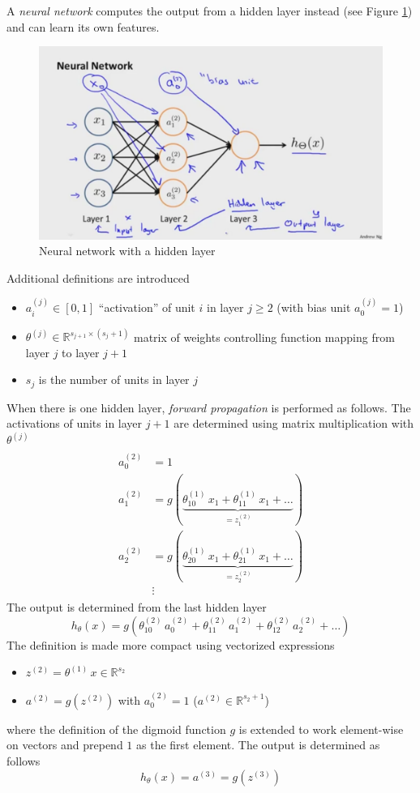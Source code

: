 \documentclass[a4paper,twoside,10pt]{article}
\begin{document}
A \emph{neural network} computes the output from a hidden layer instead (see Figure \ref{fig:hidden}) and can learn its own features.
\begin{figure}[htbp]
  \begin{center}
    \includegraphics[width=.6\textwidth]{hidden}
    \caption{Neural network with a hidden layer\citep{andrewng}\label{fig:hidden}}
  \end{center}
\end{figure}
Additional definitions are introduced
\begin{itemize}
  \item $a^{(j)}_i\in[0,1]$ ``activation'' of unit $i$ in layer $j\ge 2$ (with bias unit $a^{(j)}_0=1$)
  \item $\theta^{(j)}\in\mathbb{R}^{s_{j+1}\times(s_j+1)}$ matrix of weights controlling function mapping from layer $j$ to layer $j+1$
  \item $s_j$ is the number of units in layer $j$
\end{itemize}
When there is one hidden layer, \emph{forward propagation} is performed as follows.
The activations of units in layer $j+1$ are determined using matrix multiplication with $\theta^{(j)}$
\begin{align*}
  \begin{split}
    a^{(2)}_0&=1\\
    a^{(2)}_1&=g(\underbrace{\theta^{(1)}_{10}\,x_1+\theta^{(1)}_{11}\,x_1+\ldots}_{=z^{(2)}_1})\\
    a^{(2)}_2&=g(\underbrace{\theta^{(1)}_{20}\,x_1+\theta^{(1)}_{21}\,x_1+\ldots}_{=z^{(2)}_2})\\
    &\vdots
  \end{split}
\end{align*}
The output is determined from the last hidden layer
\begin{equation*}
  h_\theta(x)=g(\theta^{(2)}_{10}\,a^{(2)}_0+\theta^{(2)}_{11}\,a^{(2)}_1+\theta^{(2)}_{12}\,a^{(2)}_2+\ldots)
\end{equation*}
The definition is made more compact using vectorized expressions
\begin{itemize}
  \item $z^{(2)}=\theta^{(1)}\,x\in\mathbb{R}^{s_2}$
  \item $a^{(2)}=g(z^{(2)})$ with $a^{(2)}_0=1$ ($a^{(2)}\in\mathbb{R}^{s_2+1}$)
\end{itemize}
where the definition of the digmoid function $g$ is extended to work element-wise on vectors and prepend $1$ as the first element.
The output is determined as follows
\begin{equation*}
  h_\theta(x)=a^{(3)}=g(z^{(3)})
\end{equation*}
\end{document}
